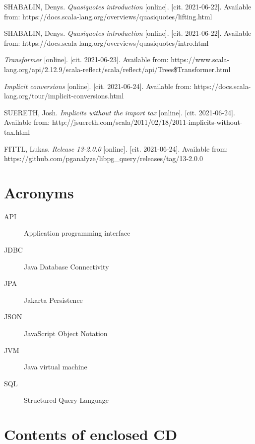 \documentclass[thesis=B,english]{FITthesis}[2019/12/23]
\begin{document}
\begin{thebibliography}{9}
SHABALIN, Denys.
\textit {Quasiquotes introduction} [online]. [cit. 2021-06-22]. Available from:
https://docs.scala-lang.org/overviews/quasiquotes/lifting.html

SHABALIN, Denys.
\textit {Quasiquotes introduction} [online]. [cit. 2021-06-22]. Available from:
https://docs.scala-lang.org/overviews/quasiquotes/intro.html

\textit {Transformer} [online]. [cit. 2021-06-23]. Available from:
https://www.scala-lang.org/api/2.12.9/scala-reflect/scala/reflect/api/Trees\$Transformer.html

\textit {Implicit conversions} [online]. [cit. 2021-06-24]. Available from:
https://docs.scala-lang.org/tour/implicit-conversions.html

SUERETH, Josh.
\textit {Implicits without the import tax} [online]. [cit. 2021-06-24]. Available from: http://jsuereth.com/scala/2011/02/18/2011-implicits-without-tax.html

FITTL, Lukas.
\textit {Release 13-2.0.0} [online]. [cit. 2021-06-24]. Available from:
https://github.com/pganalyze/libpg\_query/releases/tag/13-2.0.0

\end{thebibliography}
\appendix

\chapter{Acronyms}
\begin{description}
	\item[API] Application programming interface
	\item[JDBC] Java Database Connectivity
	\item[JPA] Jakarta Persistence
	\item[JSON] JavaScript Object Notation
	\item[JVM] Java virtual machine
	\item[SQL] Structured Query Language
\end{description}


\chapter{Contents of enclosed CD}


\begin{figure}
\end{figure}
\end{document}
